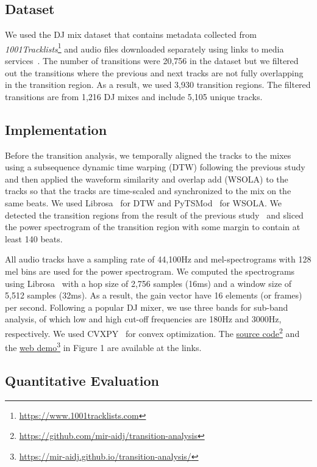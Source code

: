 \documentclass[sigconf]{nimeart}
\begin{document}
\subsection{Dataset}\label{dataset}

We used the DJ mix dataset that contains metadata collected from \emph{1001Tracklists}\footnote{\url{https://www.1001tracklists.com}} and audio files downloaded separately using links to media services~\cite{c19}. The number of transitions were 20,756 in the dataset but we filtered out the transitions where the previous and next tracks are not fully overlapping in the transition region. As a result, we used 3,930 transition regions. The filtered transitions are from 1,216 DJ mixes and include 5,105 unique tracks.

\subsection{Implementation}\label{implementation}

Before the transition analysis, we temporally aligned the tracks to the mixes using a subsequence dynamic time warping (DTW) following the previous study~\cite{c19} and then applied the waveform similarity and overlap add (WSOLA) to the tracks so that the tracks are time-scaled and synchronized to the mix on the same beats. We used Librosa~\cite{c20} for DTW and PyTSMod~\cite{c21} for WSOLA. We detected the transition regions from the result of the previous study~\cite{c19} and sliced the power spectrogram of the transition region with some margin to contain at least 140 beats.

All audio tracks have a sampling rate of 44,100Hz and mel-spectrograms with 128 mel bins are used for the power spectrogram. We computed the spectrograms using Librosa~\cite{c20} with a hop size of 2,756 samples (16ms) and a window size of 5,512 samples (32ms). As a result, the gain vector have 16 elements (or frames) per second. Following a popular DJ mixer, we use three bands for sub-band analysis, of which low and high cut-off frequencies are 180Hz and 3000Hz, respectively. We used CVXPY~\cite{c22} for convex optimization. The \href{https://github.com/mir-aidj/transition-analysis}{source code}\footnote{\href{}{https://github.com/mir-aidj/transition-analysis}} and the \href{https://mir-aidj.github.io/transition-analysis}{web demo}\footnote{\href{}{https://mir-aidj.github.io/transition-analysis/}} in Figure 1 are available at the links.

\subsection{Quantitative Evaluation}\label{quantitative-evaluation}
\end{document}
